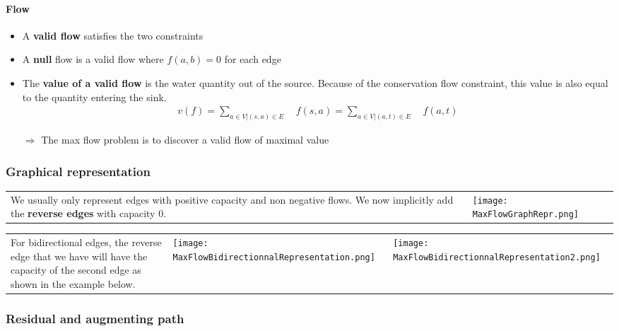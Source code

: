 \paragraph{Flow}
\begin{itemize} 
    \item A \textbf{valid flow} satisfies the two constraints
    \item A \textbf{null} flow is a valid flow where $f(a,b)=0$ for each
        edge
    \item The \textbf{value of a valid flow} is the water quantity out
        of the source. Because of the conservation flow constraint, this
        value is also equal to the quantity entering the sink.
        \begin{eqnarray*}
            v(f) =    \sum_{a \in V |(s,a) \in E} \quad f(s,a)  =
            \sum_{a \in V|(a,t) \in E}
            \quad f(a,t) 
        \end{eqnarray*}

    \item[$\Rightarrow$] The max flow problem is to discover a valid flow of
maximal value
\end{itemize}



\subsubsection{Graphical representation}

\begin{tabular}{m{9cm}m{8cm}}
We usually only represent edges with positive capacity and non
negative flows. We now implicitly add the \textbf{reverse edges} with
capacity 0.
&
    \texttt{[image: MaxFlowGraphRepr.png]}
\end{tabular}

\begin{tabular}{m{10cm}m{1.5cm}m{1.5cm}}
For bidirectional edges, the reverse edge that we have will have the capacity of the second edge as shown in the example below.
&
    \texttt{[image: MaxFlowBidirectionnalRepresentation.png]}
    &
    \texttt{[image: MaxFlowBidirectionnalRepresentation2.png]}
\end{tabular}


\subsubsection{Residual and augmenting path}

